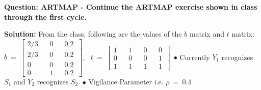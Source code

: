 \documentclass[12pt]{article}
\begin{document}
\textbf{Question: ARTMAP - Continue the ARTMAP exercise shown in class through the first cycle.}

\BlankLine
\BlankLine

\textbf{Solution:} 
\BlankLine
From the class, following are the values of the $b$ matrix and $t$ matrix: \BlankLine
$ b \ = \ \begin{bmatrix}
  2/3 && 0 && 0.2 \ \\
  2/3 && 0 && 0.2 \ \\
  0 && 0 && 0.2 \ \\
  0 && 1 && 0.2 \
\end{bmatrix}$, \ $ t  \ = \ \begin{bmatrix} 1 && 1 && 0 && 0 \\ 0 && 0 && 0 && 1 \\ 1 && 1 && 1 && 1 \ \end{bmatrix}$ 
\BlankLine
$\bullet$ Currently $Y_1$ recognizes $S_1$ and $Y_2$ recognizes $S_2$.
\BlankLine
$\bullet$ Vigilance Parameter i.e. $\rho \ = \ 0.4$
\BlankLine
\end{document}
